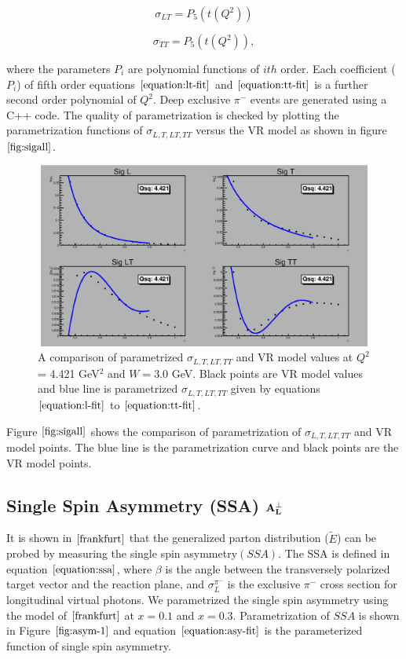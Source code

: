 \documentclass{article}
\begin{document}
\begin{equation}
        \sigma_{LT} = P_{5}(t(Q^2))        
     \label{equation:lt-fit}
\end{equation}

\begin{equation}
        \sigma_{TT} = P_{5}(t(Q^2)),        
     \label{equation:tt-fit}
\end{equation}

where the parameters $P_{i}$ are polynomial functions of $ith$ order. Each coefficient ($P_{i}$) of fifth order equations 
$\ref{equation:lt-fit}$ and $\ref{equation:tt-fit}$ is a further second order polynomial of $Q^2$. Deep exclusive $\pi^{-}$ events are 
generated using a C++ code. The quality of parametrization is checked by plotting the parametrization functions of $\sigma_{L,T,LT,TT}$ 
versus the VR model as shown in figure $\ref{fig:sigall}$.

\begin{figure}[!hbt]
    \centering
    \includegraphics[width=6.0in,height=2.4in]{pimFit.eps}
    \caption{ A comparison of parametrized $\sigma_{L,T,LT,TT}$ and VR model values at $Q^2$ = 4.421 GeV$^2$ and $W = 3.0$ GeV.  
    Black points are VR model values and blue line is parametrized $\sigma_{L,T,LT,TT}$ given by equations 
    $\ref{equation:l-fit}$ to $\ref{equation:tt-fit}$. }
    \label{fig:sigall}
\end{figure}

Figure $\ref{fig:sigall}$ shows the comparison of parametrization of $\sigma_{L,T,LT,TT}$ and VR model points. The blue line is the 
parametrization curve and black points are the VR model points.

\subsection{Single Spin Asymmetry (SSA) $\bf{A_{L}^{\perp}}$ }
It is shown in $\cite{frankfurt}$ that the generalized parton distribution ($\tilde{E}$) can be probed by measuring the single spin 
asymmetry$(SSA)$. The SSA is defined in equation $\ref{equation:ssa}$, where $\beta$ is the angle between the transversely polarized 
target vector and the reaction plane, and $\sigma_{L}^{\pi^{-}}$ is the exclusive $\pi^{-}$ cross section for longitudinal virtual photons. 
We parametrized the single spin asymmetry using the model of $\cite{frankfurt}$ at $x = 0.1$ and $x = 0.3$. Parametrization of $SSA$ 
is shown in Figure $\ref{fig:asym-1}$ and equation $\ref{equation:asy-fit}$ is the parameterized function of single spin asymmetry.
\end{document}
